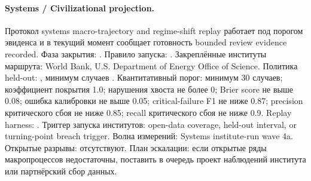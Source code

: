\paragraph{Systems / Civilizational projection.}
Протокол systems macro-trajectory and regime-shift replay работает под порогом эвиденса  и в текущий момент сообщает готовность bounded review evidence recorded.
Фаза закрытия: . Правило запуска: .
Закреплённые институты маршрута: World Bank, \allowbreak U.S. Department of Energy Office of Science.
Политика held-out: , минимум случаев .
Квантитативный порог: минимум 30 случаев; коэффициент покрытия 1.0; нарушения хвоста не более 0; Brier score не выше 0.08; ошибка калибровки не выше 0.05; critical-failure F1 не ниже 0.87; precision критического сбоя не ниже 0.85; recall критического сбоя не ниже 0.9.
Replay harness: .
Триггер запуска институтов: open-data coverage, held-out interval, or turning-point breach trigger. Волна измерений: Systems institute-run wave 4a.
Открытые разрывы: отсутствуют.
План эскалации: если открытые ряды макропроцессов недостаточны, поставить в очередь проект наблюдений института или партнёрский сбор данных.
